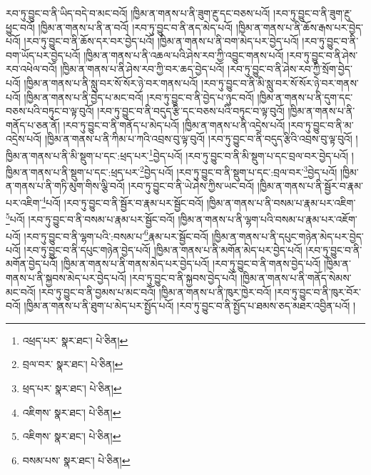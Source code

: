 རབ་ཏུ་བྱུང་བ་ནི་ཡིད་བདེ་བ་མང་བའོ། །ཁྱིམ་ན་གནས་པ་ནི་ཟུག་རྔུ་དང་བཅས་པའོ། །རབ་ཏུ་བྱུང་བ་ནི་ཟུག་རྔུ་ཕྱུང་བའོ། །ཁྱིམ་ན་གནས་པ་ནི་ན་བའོ། །རབ་ཏུ་བྱུང་བ་ནི་ནད་མེད་པའོ། །ཁྱིམ་ན་གནས་པ་ནི་ཆོས་རྒས་པར་བྱེད་པའོ། །རབ་ཏུ་བྱུང་བ་ནི་ཆོས་དར་བར་བྱེད་པའོ། །ཁྱིམ་ན་གནས་པ་ནི་བག་མེད་པར་བྱེད་པའོ། །རབ་ཏུ་བྱུང་བ་ནི་བག་ཡོད་པར་བྱེད་པའོ། །ཁྱིམ་ན་གནས་པ་ནི་འཆལ་པའི་ཤེས་རབ་ཀྱི་འབྱུང་གནས་པའོ། །རབ་ཏུ་བྱུང་བ་ནི་ཤེས་རབ་འཕེལ་བའོ། །ཁྱིམ་ན་གནས་པ་ནི་ཤེས་རབ་ཀྱི་བར་ཆད་བྱེད་པའོ། །རབ་ཏུ་བྱུང་བ་ནི་ཤེས་རབ་ཀྱི་སྲོག་བྱེད་པའོ། །ཁྱིམ་ན་གནས་པ་ནི་སླུ་བར་སོ་སོར་ཉེ་བར་གནས་པའོ། །རབ་ཏུ་བྱུང་བ་ནི་མི་སླུ་བར་སོ་སོར་ཉེ་བར་གནས་པའོ། །ཁྱིམ་ན་གནས་པ་ནི་བྱེད་པ་མང་བའོ། །རབ་ཏུ་བྱུང་བ་ནི་བྱེད་པ་ཉུང་བའོ། །ཁྱིམ་ན་གནས་པ་ནི་དུག་དང་བཅས་པའི་བཏུང་བ་ལྟ་བུའོ། །རབ་ཏུ་བྱུང་བ་ནི་བདུད་རྩི་དང་བཅས་པའི་བཏུང་བ་ལྟ་བུའོ། །ཁྱིམ་ན་གནས་པ་ནི་གནོད་པ་ཅན་ནོ། །རབ་ཏུ་བྱུང་བ་ནི་གནོད་པ་མེད་པའོ། །ཁྱིམ་ན་གནས་པ་ནི་འདྲེས་པའོ། །རབ་ཏུ་བྱུང་བ་ནི་མ་འདྲེས་པའོ། །ཁྱིམ་ན་གནས་པ་ནི་ཀིམ་པ་ཀའི་འབྲས་བུ་ལྟ་བུའོ། །རབ་ཏུ་བྱུང་བ་ནི་བདུད་རྩིའི་འབྲས་བུ་ལྟ་བུའོ། །ཁྱིམ་ན་གནས་པ་ནི་མི་སྡུག་པ་དང་:ཕྲད་པར་\footnote{འཕྲད་པར་  སྣར་ཐང་།  པེ་ཅིན། }བྱེད་པའོ། །རབ་ཏུ་བྱུང་བ་ནི་མི་སྡུག་པ་དང་བྲལ་བར་བྱེད་པའོ། །ཁྱིམ་ན་གནས་པ་ནི་སྡུག་པ་དང་:ཕྲད་པར་\footnote{བྲལ་བར་  སྣར་ཐང་།  པེ་ཅིན། }བྱེད་པའོ། །རབ་ཏུ་བྱུང་བ་ནི་སྡུག་པ་དང་:བྲལ་བར་\footnote{ཕྲད་པར་  སྣར་ཐང་།  པེ་ཅིན། }བྱེད་པའོ། །ཁྱིམ་ན་གནས་པ་ནི་གཏི་མུག་གིས་ལྕི་བའོ། །རབ་ཏུ་བྱུང་བ་ནི་ཡེ་ཤེས་ཀྱིས་ཡང་བའོ། །ཁྱིམ་ན་གནས་པ་ནི་སྦྱོར་བ་རྣམ་པར་འཇིག་\footnote{འཇིགས་  སྣར་ཐང་།  པེ་ཅིན། }པའོ། །རབ་ཏུ་བྱུང་བ་ནི་སྦྱོར་བ་རྣམ་པར་སྦྱོང་བའོ། །ཁྱིམ་ན་གནས་པ་ནི་བསམ་པ་རྣམ་པར་འཇིག་\footnote{འཇིགས་  སྣར་ཐང་།  པེ་ཅིན། }པའོ། །རབ་ཏུ་བྱུང་བ་ནི་བསམ་པ་རྣམ་པར་སྦྱོང་བའོ། །ཁྱིམ་ན་གནས་པ་ནི་ལྷག་པའི་བསམ་པ་རྣམ་པར་འཇོག་པའོ། །རབ་ཏུ་བྱུང་བ་ནི་ལྷག་པའི་:བསམ་པ་\footnote{བསམ་པས་  སྣར་ཐང་།  པེ་ཅིན། }རྣམ་པར་སྦྱོང་བའོ། །ཁྱིམ་ན་གནས་པ་ནི་དཔུང་གཉེན་མེད་པར་བྱེད་པའོ། །རབ་ཏུ་བྱུང་བ་ནི་དཔུང་གཉེན་བྱེད་པའོ། །ཁྱིམ་ན་གནས་པ་ནི་མགོན་མེད་པར་བྱེད་པའོ། །རབ་ཏུ་བྱུང་བ་ནི་མགོན་བྱེད་པའོ། །ཁྱིམ་ན་གནས་པ་ནི་གནས་མེད་པར་བྱེད་པའོ། །རབ་ཏུ་བྱུང་བ་ནི་གནས་བྱེད་པའོ། །ཁྱིམ་ན་གནས་པ་ནི་སྐྱབས་མེད་པར་བྱེད་པའོ། །རབ་ཏུ་བྱུང་བ་ནི་སྐྱབས་བྱེད་པའོ། །ཁྱིམ་ན་གནས་པ་ནི་གནོད་སེམས་མང་བའོ། །རབ་ཏུ་བྱུང་བ་ནི་བྱམས་པ་མང་བའོ། །ཁྱིམ་ན་གནས་པ་ནི་ཁུར་ཁྱེར་བའོ། །རབ་ཏུ་བྱུང་བ་ནི་ཁུར་བོར་བའོ། །ཁྱིམ་ན་གནས་པ་ནི་ཐུག་པ་མེད་པར་སྤྱོད་པའོ། །རབ་ཏུ་བྱུང་བ་ནི་སྤྱོད་པ་ཐམས་ཅད་མཐར་འབྱིན་པའོ། །
